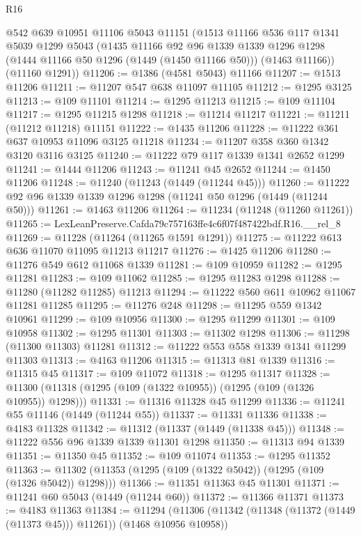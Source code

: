 \begin{lexlean}{R16}
\begin{coremodule}
    @542
    @639
    @10951
    @11106
    @5043
    @11151
    (@1513
      @11166
      @536
      @117
      @1341
      @5039
      @1299
      @5043
      (@1435
        @11166
        @92
        @96
        @1339
        @1339
        @1296
        @1298
        (@1444 @11166 @50 @1296 (@1449 (@1450 @11166 @50)))
        (@1463 @11166))
      (@11160 @1291))
@11206 := @1386 (@4581 @5043) @11166
@11207 := @1513 @11206
@11211 := @11207 @547 @638 @11097 @11105
@11212 := @1295 @3125
@11213 := @109 @11101
@11214 := @1295 @11213
@11215 := @109 @11104
@11217 := @1295 @11215 @1298
@11218 := @11214 @11217
@11221 := @11211 (@11212 @11218) @11151
@11222 := @1435 @11206
@11228 := @11222 @361 @637 @10953 @11096 @3125 @11218
@11234 := @11207 @358 @360 @1342 @3120 @3116 @3125
@11240 := @11222 @79 @117 @1339 @1341 @2652 @1299
@11241 := @1444 @11206
@11243 := @11241 @45 @2652
@11244 := @1450 @11206
@11248 := @11240 (@11243 (@1449 (@11244 @45)))
@11260 := @11222 @92 @96 @1339 @1339 @1296 @1298 (@11241 @50 @1296 (@1449 (@11244 @50)))
@11261 := @1463 @11206
@11264 := @11234 (@11248 (@11260 @11261))
@11265 := LexLeanPreserve.Cafda79c757163ffe4c6f07f487422bdf.R16.__rel_8
@11269 := @11228 (@11264 (@11265 @1591 @1291))
@11275 := @11222 @613 @636 @11070 @11095 @11213 @11217
@11276 := @1425 @11206
@11280 := @11276 @549 @612 @11068 @1339
@11281 := @109 @10959
@11282 := @1295 @11281
@11283 := @109 @11062
@11285 := @1295 @11283 @1298
@11288 := @11280 (@11282 @11285) @11213
@11294 := @11222 @560 @611 @10962 @11067 @11281 @11285
@11295 := @11276 @248
@11298 := @11295 @559 @1342 @10961
@11299 := @109 @10956
@11300 := @1295 @11299
@11301 := @109 @10958
@11302 := @1295 @11301
@11303 := @11302 @1298
@11306 := @11298 (@11300 @11303) @11281
@11312 := @11222 @553 @558 @1339 @1341 @11299 @11303
@11313 := @4163 @11206
@11315 := @11313 @81 @1339
@11316 := @11315 @45
@11317 := @109 @11072
@11318 := @1295 @11317
@11328 := @11300 (@11318 (@1295 (@109 (@1322 @10955)) (@1295 (@109 (@1326 @10955)) @1298)))
@11331 := @11316 @11328 @45 @11299
@11336 := @11241 @55 @11146 (@1449 (@11244 @55))
@11337 := @11331 @11336
@11338 := @4183 @11328
@11342 := @11312 (@11337 (@1449 (@11338 @45)))
@11348 := @11222 @556 @96 @1339 @1339 @11301 @1298
@11350 := @11313 @94 @1339
@11351 := @11350 @45
@11352 := @109 @11074
@11353 := @1295 @11352
@11363 := @11302 (@11353 (@1295 (@109 (@1322 @5042)) (@1295 (@109 (@1326 @5042)) @1298)))
@11366 := @11351 @11363 @45 @11301
@11371 := @11241 @60 @5043 (@1449 (@11244 @60))
@11372 := @11366 @11371
@11373 := @4183 @11363
@11384 := @11294
    (@11306 (@11342 (@11348 (@11372 (@1449 (@11373 @45))) @11261)) (@1468 @10956 @10958))

\end{coremodule}
\end{lexlean}
